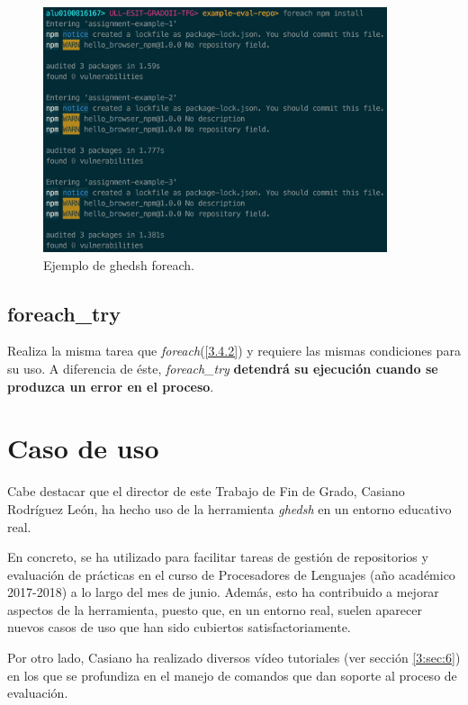 \begin{figure}[H]
	\begin{center}
	\includegraphics[width=0.9\textwidth]{images/foreach-example}
	\caption{Ejemplo de ghedsh foreach.}
	\label{fig:foreach-example}
	\end{center}
\end{figure}

\subsection{foreach\_try}
\label{3.4.3}

Realiza la misma tarea que {\it foreach}(\ref{3.4.2}) y requiere las mismas condiciones para su uso. A diferencia de éste, {\it foreach\_try} \textbf{detendrá su ejecución cuando se produzca un error en el proceso}.

\section{Caso de uso}
\label{3:sec:5}

Cabe destacar que el director de este Trabajo de Fin de Grado, Casiano Rodríguez León, ha hecho uso de la herramienta {\it ghedsh} en un entorno educativo real.
\bigskip

En concreto, se ha utilizado para facilitar tareas de gestión de repositorios y evaluación de prácticas en el curso de Procesadores de Lenguajes (año académico 2017-2018) a lo largo del mes de junio. Además, esto ha contribuido a mejorar aspectos de la herramienta,
puesto que, en un entorno real, suelen aparecer nuevos casos de uso que han sido cubiertos satisfactoriamente.
\bigskip

Por otro lado, Casiano ha realizado diversos vídeo tutoriales (ver sección \ref{3:sec:6}) en los que se profundiza en el manejo de comandos que dan soporte al proceso de evaluación.

